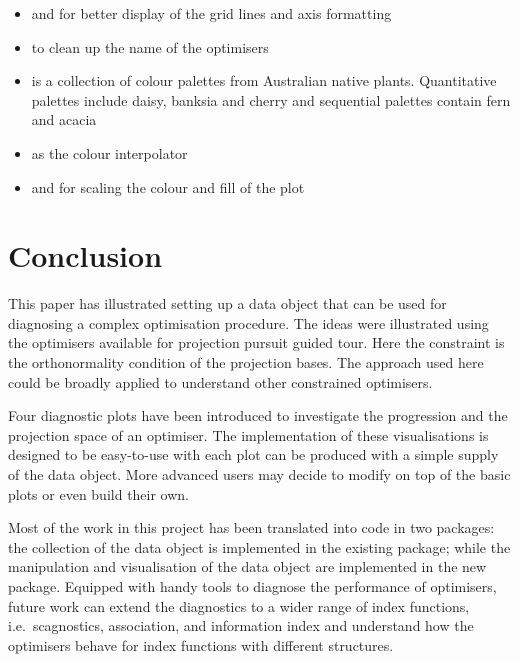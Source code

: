 \begin{itemize}
  \begin{itemize}
  \tightlist
  \item
     and  for better display
    of the grid lines and axis formatting
  \item
     to clean up the name of the optimisers
  \item
     is a collection of colour palettes from
    Australian native plants. Quantitative palettes include daisy,
    banksia and cherry and sequential palettes contain fern and acacia
  \item
     as the colour interpolator
  \item
     and  for scaling the
    colour and fill of the plot
  \end{itemize}
\end{itemize}

\hypertarget{conclusion}{%
\section{Conclusion}\label{conclusion}}

This paper has illustrated setting up a data object that can be used for
diagnosing a complex optimisation procedure. The ideas were illustrated
using the optimisers available for projection pursuit guided tour. Here
the constraint is the orthonormality condition of the projection bases.
The approach used here could be broadly applied to understand other
constrained optimisers.

Four diagnostic plots have been introduced to investigate the
progression and the projection space of an optimiser. The implementation
of these visualisations is designed to be easy-to-use with each plot can
be produced with a simple supply of the data object. More advanced users
may decide to modify on top of the basic plots or even build their own.

Most of the work in this project has been translated into code in two
packages: the collection of the data object is implemented in the
existing  \citep{tourr} package; while the manipulation
and visualisation of the data object are implemented in the new
 package. Equipped with handy tools to diagnose the
performance of optimisers, future work can extend the diagnostics to a
wider range of index functions, i.e.~scagnostics, association, and
information index \citep{laa2020using} and understand how the optimisers
behave for index functions with different structures.

